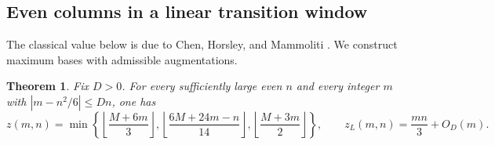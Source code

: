 \documentclass[11pt]{article}
\newtheorem{theorem}{Theorem}
\newcommand{\zl}{z_L}
\begin{document}
\subsection{Even columns in a linear transition window}\label{sec:eventransition}
The classical value below is due to Chen, Horsley, and Mammoliti
\cite[Theorems 1.1--1.2]{chm-triple}. We construct maximum bases with
admissible augmentations.

\begin{theorem}\label{thm:eventransition}
Fix $D>0$. For every sufficiently large even $n$ and every integer $m$
with $|m-n^2/6|\le Dn$, one has
\[
 z(m,n)=\min\left\{
 \left\lfloor\frac{M+6m}{3}\right\rfloor,
 \left\lfloor\frac{6M+24m-n}{14}\right\rfloor,
 \left\lfloor\frac{M+3m}{2}\right\rfloor\right\},
 \qquad \zl(m,n)=\frac{mn}{3}+O_D(m).
\]
\end{theorem}
\end{document}
